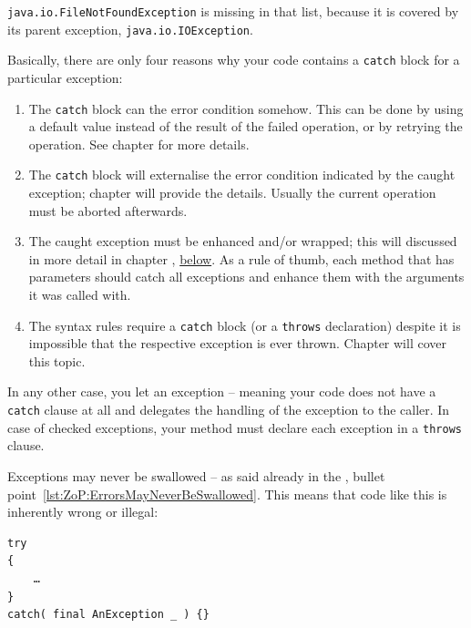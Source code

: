 \lstinline|java.io.FileNotFoundException| is missing in that list, because it is covered by its parent exception, \lstinline|java.io.IOException|.

\bigskip

Basically, there are only four reasons why your code contains a \lstinline|catch| block for a particular exception:
\begin{enumerate}
	\item{The \lstinline|catch| block can  the error condition somehow. This can be done by using a default value instead of the result of the failed operation, or by retrying the operation. See chapter  for more details.}
	
	\item{The \lstinline|catch| block will externalise the error condition indicated by the caught exception; chapter  will provide the details. Usually the current operation must be aborted afterwards.}
	
	\item{The caught exception must be enhanced and/or wrapped; this will discussed in more detail in chapter , \hyperref[sec:ThrowingExceptions]{below}. As a rule of thumb, each method that has parameters should catch all exceptions and enhance them with the arguments it was called with.}
	
	\item{The \Java syntax rules require a \lstinline|catch| block (or a \lstinline|throws| declaration) despite it is impossible that the respective exception is ever thrown. Chapter  will cover this topic.}
\end{enumerate}

In any other case, you let an exception  – meaning your code does not have a \lstinline|catch| clause at all and delegates the handling of the exception to the caller. In case of checked exceptions, your method must declare each exception in a \lstinline|throws| clause. 

Exceptions may never be swallowed – as said already in the \ngref, bullet point~\ref{lst:ZoP:ErrorsMayNeverBeSwallowed}. This means that code like this is inherently wrong or illegal:
\begin{lstlisting}
try
{
    …
}
catch( final AnException _ ) {}
\end{lstlisting}

